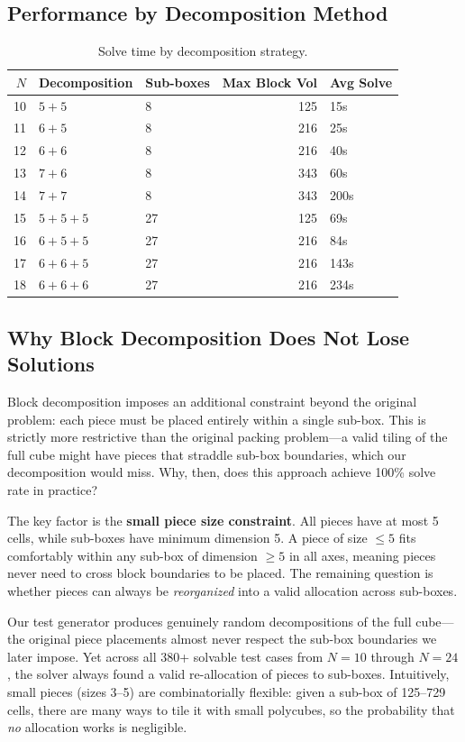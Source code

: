 \documentclass[11pt]{article}
\begin{document}
\subsection{Performance by Decomposition Method}

\begin{table}[H]
\centering
\begin{tabular}{@{}rllrl@{}}
\toprule
$N$ & \textbf{Decomposition} & \textbf{Sub-boxes} & \textbf{Max Block Vol} & \textbf{Avg Solve} \\
\midrule
10 & $5+5$ & 8 & 125 & 15s \\
11 & $6+5$ & 8 & 216 & 25s \\
12 & $6+6$ & 8 & 216 & 40s \\
13 & $7+6$ & 8 & 343 & 60s \\
14 & $7+7$ & 8 & 343 & 200s \\
15 & $5+5+5$ & 27 & 125 & 69s \\
16 & $6+5+5$ & 27 & 216 & 84s \\
17 & $6+6+5$ & 27 & 216 & 143s \\
18 & $6+6+6$ & 27 & 216 & 234s \\
\bottomrule
\end{tabular}
\caption{Solve time by decomposition strategy.}
\end{table}

\subsection{Why Block Decomposition Does Not Lose Solutions}

Block decomposition imposes an additional constraint beyond the original problem: each piece must be placed entirely within a single sub-box. This is strictly more restrictive than the original packing problem---a valid tiling of the full cube might have pieces that straddle sub-box boundaries, which our decomposition would miss. Why, then, does this approach achieve 100\% solve rate in practice?

The key factor is the \textbf{small piece size constraint}. All pieces have at most 5 cells, while sub-boxes have minimum dimension 5. A piece of size $\leq 5$ fits comfortably within any sub-box of dimension $\geq 5$ in all axes, meaning pieces never need to cross block boundaries to be placed. The remaining question is whether pieces can always be \emph{reorganized} into a valid allocation across sub-boxes.

Our test generator produces genuinely random decompositions of the full cube---the original piece placements almost never respect the sub-box boundaries we later impose. Yet across all 380+ solvable test cases from $N=10$ through $N=24$, the solver always found a valid re-allocation of pieces to sub-boxes. Intuitively, small pieces (sizes 3--5) are combinatorially flexible: given a sub-box of 125--729 cells, there are many ways to tile it with small polycubes, so the probability that \emph{no} allocation works is negligible.
\end{document}
